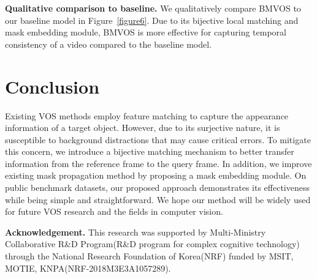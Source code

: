 \documentclass[10pt,twocolumn,letterpaper]{article}
\begin{document}
	
	\vspace{1mm}
	\noindent\textbf{Qualitative comparison to baseline.} We qualitatively compare BMVOS to our baseline model in Figure~\ref{figure6}. Due to its bijective local matching and mask embedding module, BMVOS is more effective for capturing temporal consistency of a video compared to the baseline model. 
	
	
	
	\section{Conclusion}
	Existing VOS methods employ feature matching to capture the appearance information of a target object. However, due to its surjective nature, it is susceptible to background distractions that may cause critical errors. To mitigate this concern, we introduce a bijective matching mechanism to better transfer information from the reference frame to the query frame. In addition, we improve existing mask propagation method by proposing a mask embedding module. On public benchmark datasets, our proposed approach demonstrates its effectiveness while being simple and straightforward. We hope our method will be widely used for future VOS research and the fields in computer vision. 
	
	
	\vspace*{\fill}
	\noindent\footnotesize\textbf{Acknowledgement.} This research was supported by Multi-Ministry Collaborative R\&D Program(R\&D program for complex cognitive technology) through the National Research Foundation of Korea(NRF) funded by MSIT, MOTIE, KNPA(NRF-2018M3E3A1057289).
	
	
	{\small
		
		}
	
\end{document}
